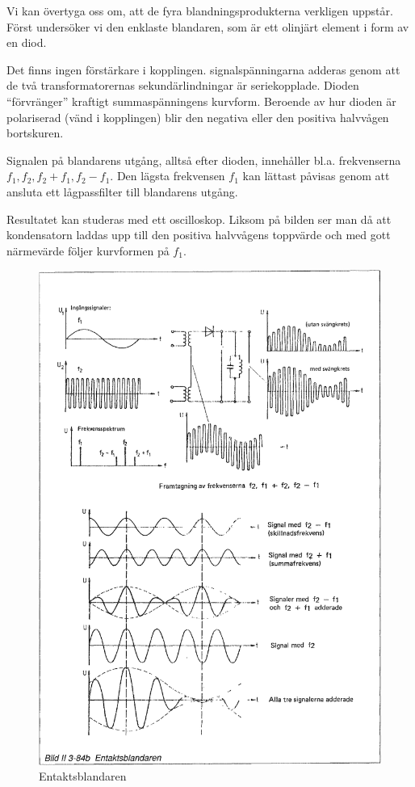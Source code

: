 Vi kan övertyga oss om, att de fyra blandningsprodukterna verkligen
uppstår. Först undersöker vi den enklaste blandaren, som är ett
olinjärt element i form av en diod.

Det finns ingen förstärkare i kopplingen.  signalspänningarna adderas
genom att de två transformatorernas sekundärlindningar är
seriekopplade. Dioden ``förvränger'' kraftigt summaspänningens
kurvform. Beroende av hur dioden är polariserad (vänd i kopplingen)
blir den negativa eller den positiva halvvågen bortskuren.

Signalen på blandarens utgång, alltså efter dioden, innehåller
bl.a. frekvenserna \(f_1, f_2, f_2+f_1, f_2-f_1\). Den lägsta
frekvensen \(f_1\) kan lättast påvisas genom att ansluta ett
lågpassfilter till blandarens utgång.

Resultatet kan studeras med ett oscilloskop. Liksom på bilden ser man
då att kondensatorn laddas upp till den positiva halvvågens toppvärde
och med gott närmevärde följer kurvformen på \(f_1\).

\begin{figure}
\includegraphics[width=\textwidth]{images/bild_2_3-84b}
\caption{Entaktsblandaren}
\label{fig:BildII3-84b}
\end{figure}

